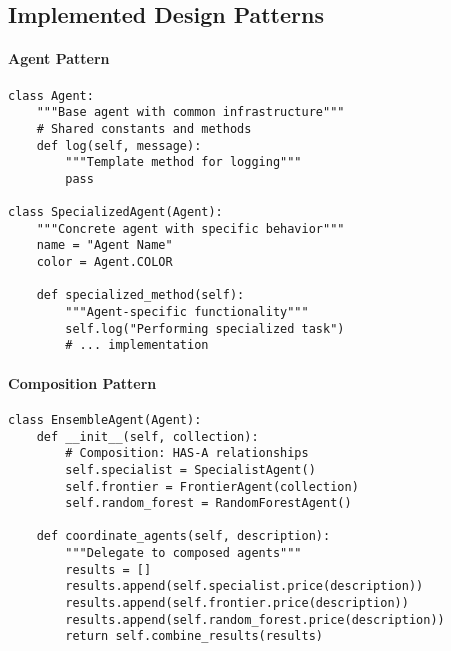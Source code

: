 \subsection{Implemented Design Patterns}

\paragraph{Agent Pattern \starfull\starfull\starfull\starfull\starempty}

\begin{lstlisting}[caption=Agent Pattern Implementation Summary]
class Agent:
    """Base agent with common infrastructure"""
    # Shared constants and methods
    def log(self, message):
        """Template method for logging"""
        pass

class SpecializedAgent(Agent):
    """Concrete agent with specific behavior"""
    name = "Agent Name"
    color = Agent.COLOR
    
    def specialized_method(self):
        """Agent-specific functionality"""
        self.log("Performing specialized task")
        # ... implementation
\end{lstlisting}

\paragraph{Composition Pattern \starfull\starfull\starfull\starfull\starempty}
\begin{lstlisting}[caption=Composition Pattern Summary]
class EnsembleAgent(Agent):
    def __init__(self, collection):
        # Composition: HAS-A relationships
        self.specialist = SpecialistAgent()
        self.frontier = FrontierAgent(collection)
        self.random_forest = RandomForestAgent()
        
    def coordinate_agents(self, description):
        """Delegate to composed agents"""
        results = []
        results.append(self.specialist.price(description))
        results.append(self.frontier.price(description))
        results.append(self.random_forest.price(description))
        return self.combine_results(results)
\end{lstlisting}

